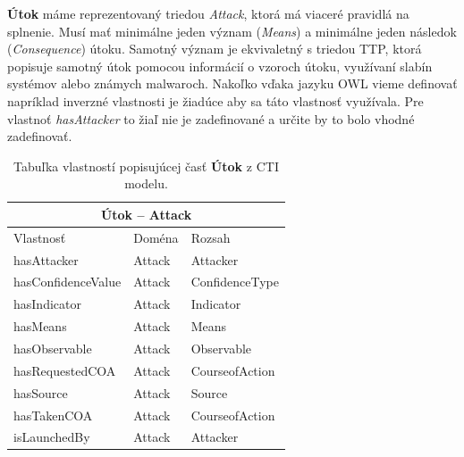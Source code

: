 \documentclass[12pt, a4paper, oneside]{book}
\begin{document}
\textbf{Útok} máme reprezentovaný triedou \textit{Attack}, ktorá má viaceré pravidlá na splnenie. Musí mať minimálne jeden význam (\textit{Means}) a minimálne jeden následok (\textit{Consequence}) útoku. Samotný význam je ekvivaletný s triedou TTP, ktorá popisuje samotný útok pomocou informácií o vzoroch útoku, využívaní slabín systémov alebo známych malwaroch. Nakoľko vďaka jazyku OWL vieme definovať napríklad inverzné vlastnosti je žiadúce aby sa táto vlastnosť využívala. Pre vlastnoť \textit{hasAttacker} to žiaľ nie je zadefinované a určite by to bolo vhodné zadefinovať.\\
%
%
\begin{table}[hbt!]
\centering
\begin{tabular}{ |p{5cm}||p{3cm}|p{3cm}|  }
 \hline
 \multicolumn{3}{|c|}{Útok -- Attack} \\
 \hline
 Vlastnosť & Doména & Rozsah\\
 \hline
 hasAttacker & Attack & Attacker\\
 hasConfidenceValue & Attack & ConfidenceType\\
 hasIndicator & Attack & Indicator\\
 hasMeans & Attack & Means\\
 hasObservable & Attack & Observable\\
 hasRequestedCOA & Attack & CourseofAction\\
 hasSource & Attack & Source\\
 hasTakenCOA & Attack & CourseofAction\\
 isLaunchedBy & Attack & Attacker\\
 \hline
\end{tabular}
\caption{Tabuľka vlastností popisujúcej časť \textbf{Útok} z CTI modelu.}
\label{tab:template}
\end{table}
\end{document}
